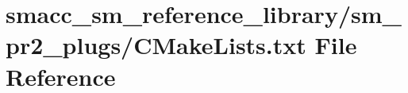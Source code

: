 \hypertarget{sm__reference__library_2sm__pr2__plugs_2CMakeLists_8txt}{}\section{smacc\+\_\+sm\+\_\+reference\+\_\+library/sm\+\_\+pr2\+\_\+plugs/\+C\+Make\+Lists.txt File Reference}
\label{sm__reference__library_2sm__pr2__plugs_2CMakeLists_8txt}
